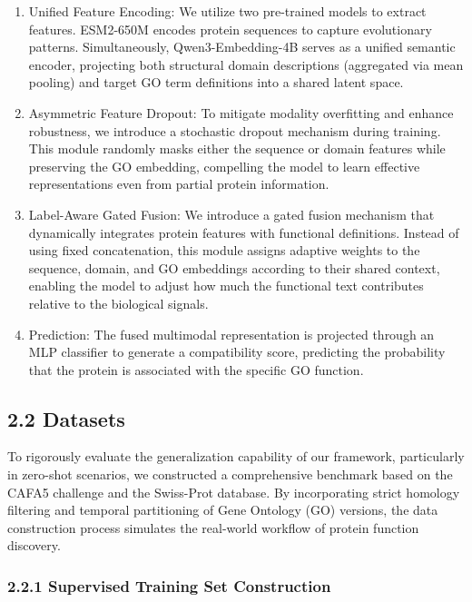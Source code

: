 \documentclass[unnumsec,webpdf,contemporary,large]{oup-authoring-template}%
\theoremstyle{thmstyleone}%
\theoremstyle{thmstyletwo}%
\theoremstyle{thmstylethree}%
\begin{document}
\begin{enumerate}
\item Unified Feature Encoding:  We utilize two pre-trained models to extract features. ESM2-650M\citep{lin2023evolutionary} encodes protein sequences to capture evolutionary patterns. Simultaneously, Qwen3-Embedding-4B\citep{zhang2025qwen3} serves as a unified semantic encoder, projecting both structural domain descriptions (aggregated via mean pooling) and target GO term definitions into a shared latent space.

\item Asymmetric Feature Dropout: To mitigate modality overfitting and enhance robustness, we introduce a stochastic dropout mechanism during training. This module randomly masks either the sequence or domain features while preserving the GO embedding, compelling the model to learn effective representations even from partial protein information.

\item Label-Aware Gated Fusion: We introduce a gated fusion mechanism that dynamically integrates protein features with functional definitions. Instead of using fixed concatenation, this module assigns adaptive weights to the sequence, domain, and GO embeddings according to their shared context, enabling the model to adjust how much the functional text contributes relative to the biological signals.

\item Prediction: The fused multimodal representation is projected through an MLP classifier\citep{taud2017multilayer} to generate a compatibility score, predicting the probability that the protein is associated with the specific GO function.
\end{enumerate}


\subsection{2.2 Datasets}\label{Datasets}

To rigorously evaluate the generalization capability of our framework, particularly in zero-shot scenarios, we constructed a comprehensive benchmark based on the CAFA5 challenge and the Swiss-Prot database\citep{boutet2007uniprotkb}. By incorporating strict homology filtering and temporal partitioning of Gene Ontology (GO) versions, the data construction process simulates the real-world workflow of protein function discovery.

\subsubsection{2.2.1 Supervised Training Set Construction}
\end{document}
